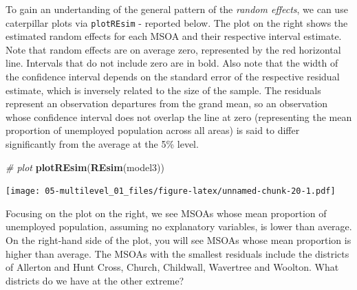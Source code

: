 \documentclass[]{book}
\newenvironment{Shaded}{\begin{snugshade}}{\end{snugshade}}
\newcommand{\KeywordTok}[1]{\textcolor[rgb]{0.13,0.29,0.53}{\textbf{#1}}}
\newcommand{\StringTok}[1]{\textcolor[rgb]{0.31,0.60,0.02}{#1}}
\newcommand{\CommentTok}[1]{\textcolor[rgb]{0.56,0.35,0.01}{\textit{#1}}}
\newcommand{\OperatorTok}[1]{\textcolor[rgb]{0.81,0.36,0.00}{\textbf{#1}}}
\newcommand{\NormalTok}[1]{#1}
\begin{document}
To gain an undertanding of the general pattern of the \emph{random
effects}, we can use caterpillar plots via \texttt{plotREsim} - reported
below. The plot on the right shows the estimated random effects for each
MSOA and their respective interval estimate. Note that random effects
are on average zero, represented by the red horizontal line. Intervals
that do not include zero are in bold. Also note that the width of the
confidence interval depends on the standard error of the respective
residual estimate, which is inversely related to the size of the sample.
The residuals represent an observation departures from the grand mean,
so an observation whose confidence interval does not overlap the line at
zero (representing the mean proportion of unemployed population across
all areas) is said to differ significantly from the average at the 5\%
level.

\begin{Shaded}
\begin{Highlighting}[]
\CommentTok{# plot}
\KeywordTok{plotREsim}\NormalTok{(}\KeywordTok{REsim}\NormalTok{(model3)) }
\end{Highlighting}
\end{Shaded}

\texttt{[image: 05-multilevel\_01\_files/figure-latex/unnamed-chunk-20-1.pdf]}

Focusing on the plot on the right, we see MSOAs whose mean proportion of
unemployed population, assuming no explanatory variables, is lower than
average. On the right-hand side of the plot, you will see MSOAs whose
mean proportion is higher than average. The MSOAs with the smallest
residuals include the districts of Allerton and Hunt Cross, Church,
Childwall, Wavertree and Woolton. What districts do we have at the other
extreme?

\begin{Shaded}
\end{Shaded}
\end{document}
